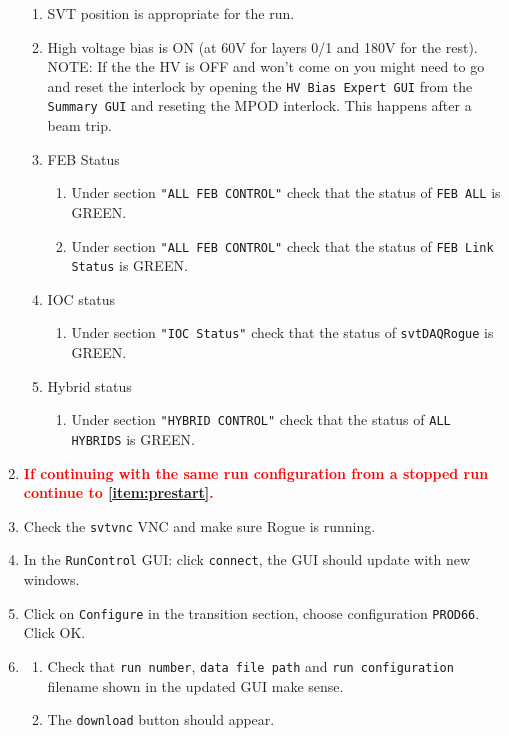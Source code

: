 \documentclass[12pt]{article}
\begin{document}
\begin{enumerate}
\begin{enumerate}
\item
SVT position is appropriate for the run. 

\item 
    High voltage bias is ON (at 60V for layers 0/1 and 180V for the rest). 
        \newline NOTE: If the the HV is OFF and won't come on you might need to go and reset the interlock by opening the  \texttt{HV Bias Expert GUI} from the \texttt{Summary GUI} and reseting the MPOD interlock. This happens after a beam trip. 
\newline {\bf \textcolor{red}{Important: Before resetting the interlock, call the SVT expert!}}


\item FEB Status
\begin{enumerate}
\item Under section \texttt{"ALL FEB CONTROL"} check that the status of \texttt{FEB ALL} is GREEN.
\item Under section \texttt{"ALL FEB CONTROL"} check that the status of \texttt{FEB Link Status} is GREEN.
\end{enumerate}

\item IOC status
\begin{enumerate}
\item Under section \texttt{"IOC Status"} check that the status of \texttt{svtDAQRogue} is GREEN.
\end{enumerate}

\item Hybrid status
\begin{enumerate}
\item Under section \texttt{"HYBRID CONTROL"} check that the status of \texttt{ALL HYBRIDS} is GREEN.
\end{enumerate}

\end{enumerate}

\item \textcolor{red}{ {\bf If continuing with the same run configuration from a stopped run continue to \ref{item:prestart}.}}

\item Check the \texttt{svtvnc} VNC and make sure Rogue is running.

\item In the \texttt{RunControl} GUI: click \texttt{connect}, the GUI should update with new windows.

\item Click on \texttt{Configure} in the transition section, choose configuration \texttt{PROD66}. Click OK.
\item
\begin{enumerate}
\item
Check that \texttt{run number}, \texttt{data file path} and \texttt{run configuration} filename shown in the updated GUI make sense. 
\item
The \texttt{download} button should appear. 
\end{enumerate}



\end{enumerate}
\end{document}
